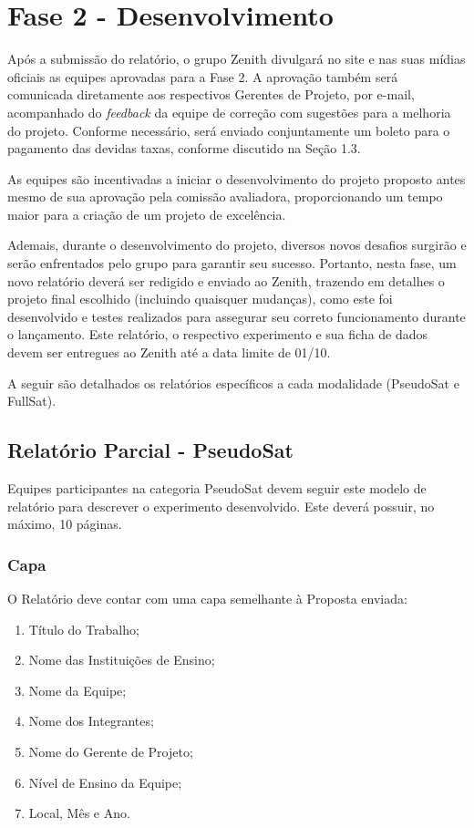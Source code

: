 \section{Fase 2 - Desenvolvimento}
    Após a submissão do relatório, o grupo Zenith divulgará no site e nas suas mídias oficiais as equipes aprovadas para a Fase 2. A aprovação também será comunicada diretamente aos respectivos Gerentes de Projeto, por e-mail, acompanhado do \textit{feedback} da equipe de correção com sugestões para a melhoria do projeto. Conforme necessário, será enviado conjuntamente um boleto para o pagamento das devidas taxas, conforme discutido na Seção 1.3.

    As equipes são incentivadas a iniciar o desenvolvimento do projeto proposto antes mesmo de sua aprovação pela comissão avaliadora, proporcionando um tempo maior para a criação de um projeto de excelência.
    
    Ademais, durante o desenvolvimento do projeto, 
    diversos novos desafios surgirão e serão enfrentados pelo grupo para 
    garantir seu sucesso. Portanto, nesta fase, um novo relatório deverá 
    ser redigido e enviado ao Zenith, trazendo em detalhes o projeto final 
    escolhido (incluindo quaisquer mudanças), como este foi desenvolvido e 
    testes realizados para assegurar seu correto funcionamento durante o 
    lançamento. Este relatório, o respectivo experimento e sua ficha de dados 
    devem ser entregues ao Zenith até a data limite de 01/10.
    
    A seguir são detalhados os relatórios específicos a cada modalidade (PseudoSat e FullSat).

    \subsection{Relatório Parcial - PseudoSat}
        Equipes participantes na categoria PseudoSat devem seguir este modelo de relatório para descrever o experimento desenvolvido. Este deverá possuir, no máximo, 10 páginas.
        
        \subsubsection{Capa}
            O Relatório deve contar com uma capa semelhante à Proposta enviada:
            \begin{enumerate}
                \item Título do Trabalho; 
                \item Nome das Instituições de Ensino; 
                \item Nome da Equipe; 
                \item Nome dos Integrantes; 
                \item Nome do Gerente de Projeto;
                \item Nível de Ensino da Equipe;
                \item Local, Mês e Ano. 
            \end{enumerate}
                    
